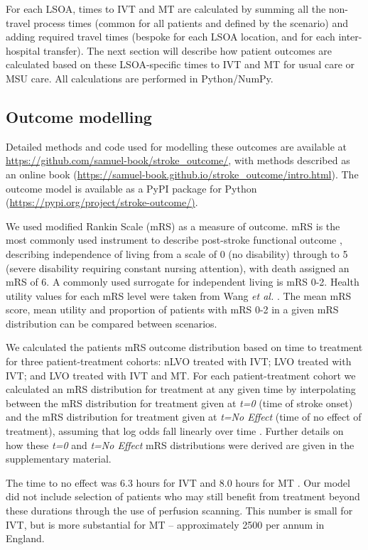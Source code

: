 For each LSOA, times to IVT and MT are calculated by summing all the non-travel process times (common for all patients and defined by the scenario) and adding required travel times (bespoke for each LSOA location, and for each inter-hospital transfer). The next section will describe how patient outcomes are calculated based on these LSOA-specific times to IVT and MT for usual care or MSU care. All calculations are performed in Python/NumPy.

\subsection{Outcome modelling}

Detailed methods and code used for modelling these outcomes are available at \url{https://github.com/samuel-book/stroke_outcome/}, with methods described as an online book (\url{https://samuel-book.github.io/stroke_outcome/intro.html}). The outcome model is available as a PyPI package for Python (\url{https://pypi.org/project/stroke-outcome/)}.

We used modified Rankin Scale (mRS) as a measure of outcome. mRS is the most commonly used instrument to describe post-stroke functional outcome \cite{quinn_functional_2009}, describing independence of living from a scale of 0 (no disability) through to 5 (severe disability requiring constant nursing attention), with death assigned an mRS of 6. A commonly used surrogate for independent living is  mRS 0-2. Health utility values for each mRS level were taken from Wang \textit{et al.} \cite{wang_utility-weighted_2020}. The mean mRS score, mean utility and proportion of patients with mRS 0-2 in a given mRS distribution can be compared between scenarios.

We calculated the patients mRS outcome distribution based on time to treatment for three patient-treatment cohorts: nLVO treated with IVT; LVO treated with IVT; and LVO treated with IVT and MT. For each patient-treatment cohort we calculated an mRS distribution for treatment at any given time by interpolating between the mRS distribution for treatment given at \emph{t=0} (time of stroke onset) and the mRS distribution for treatment given at \emph{t=No Effect} (time of no effect of treatment), assuming that log odds fall linearly over time \cite{emberson_effect_2014, fransen_time_2016}. Further details on how these \emph{t=0} and \emph{t=No Effect} mRS distributions were derived are given in the supplementary material.

The time to no effect was 6.3 hours for IVT \cite{emberson_effect_2014} and 8.0 hours for MT \cite{ fransen_time_2016}. Our model did not include selection of patients who may still benefit from treatment beyond these durations through the use of perfusion scanning. This number is small for IVT, but is more substantial for MT – approximately 2500 per annum in England. 

